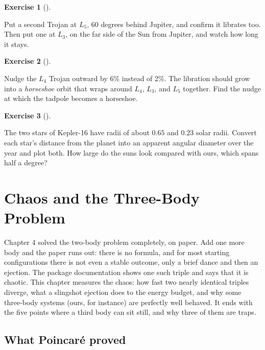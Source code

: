 \documentclass[
  10.5pt,
  letterpaper,
]{scrbook}
\theoremstyle{definition}
\newtheorem{exercise}{Exercise}[chapter]
\theoremstyle{plain}
\theoremstyle{remark}
\begin{document}
\begin{exercise}[]\protect\hypertarget{exr-ch10-l5}{}\label{exr-ch10-l5}

Put a second Trojan at \(L_5\), 60 degrees behind Jupiter, and confirm
it librates too. Then put one at \(L_3\), on the far side of the Sun
from Jupiter, and watch how long it stays.

\end{exercise}

\begin{exercise}[]\protect\hypertarget{exr-ch10-horseshoe}{}\label{exr-ch10-horseshoe}

Nudge the \(L_4\) Trojan outward by 6\% instead of 2\%. The libration
should grow into a \emph{horseshoe} orbit that wraps around \(L_4\),
\(L_3\), and \(L_5\) together. Find the nudge at which the tadpole
becomes a horseshoe.

\end{exercise}

\begin{exercise}[]\protect\hypertarget{exr-ch10-sunset-size}{}\label{exr-ch10-sunset-size}

The two stars of Kepler-16 have radii of about \(0.65\) and \(0.23\)
solar radii. Convert each star's distance from the planet into an
apparent angular diameter over the year and plot both. How large do the
suns look compared with ours, which spans half a degree?

\end{exercise}

\chapter{Chaos and the Three-Body Problem}\label{sec-chaos}

Chapter 4 solved the two-body problem completely, on paper. Add one more
body and the paper runs out: there is no formula, and for most starting
configurations there is not even a stable outcome, only a brief dance
and then an ejection. The package documentation shows one such triple
and says that it is chaotic. This chapter measures the chaos: how fast
two nearly identical triples diverge, what a slingshot ejection does to
the energy budget, and why some three-body systems (ours, for instance)
are perfectly well behaved. It ends with the five points where a third
body can sit still, and why three of them are traps.

\section{What Poincaré proved}\label{what-poincaruxe9-proved}
\end{document}
